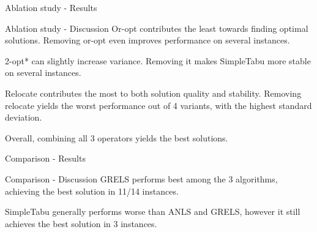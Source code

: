 \documentclass[9pt]{beamer}
\begin{document}
\begin{frame}{Ablation study - Results}

\end{frame}

\begin{frame}{Ablation study - Discussion}
Or-opt contributes the least towards finding optimal solutions. Removing or-opt even improves performance on several instances.

2-opt* can slightly increase variance. Removing it makes SimpleTabu more stable on several instances.

Relocate contributes the most to both solution quality and stability. Removing relocate yields the worst performance out of 4 variants, with the highest standard deviation.

Overall, combining all 3 operators yields the best solutions.
\end{frame}

\begin{frame}{Comparison - Results}

\end{frame}

\begin{frame}{Comparison - Discussion}
GRELS performs best among the 3 algorithms, achieving the best solution in 11/14 instances.

SimpleTabu generally performs worse than ANLS and GRELS, however it still achieves the best solution in 3 instances.
\end{frame}
\end{document}
